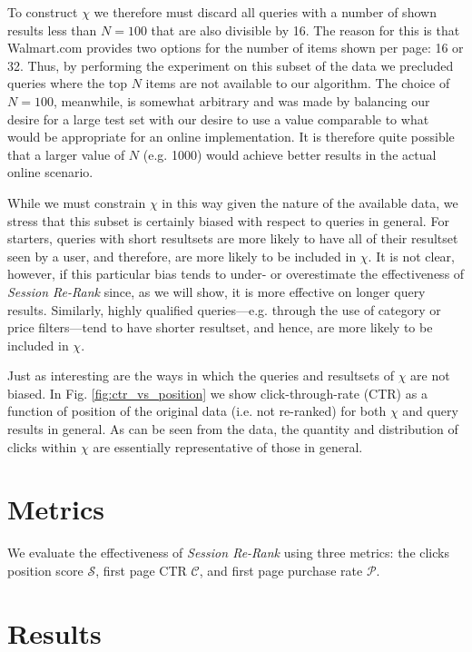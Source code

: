 \documentclass{article}
\begin{document}
To construct $\chi$ we therefore must discard all queries with a number of
shown results less than $N=100$ that are also divisible by 16. The reason for 
this is that Walmart.com provides two options for the number of items shown per
page: 16 or 32. Thus, by performing the experiment on this subset of the data we
precluded queries where the top $N$ items are not available to our algorithm.
The choice of $N=100$, meanwhile, is somewhat arbitrary and was made by balancing our desire
for a large test set with our desire to use a value comparable to what would be
appropriate for an online implementation. It is therefore quite possible that a
larger value of $N$ (e.g. 1000) would achieve better results in the actual
online scenario.

While we must constrain $\chi$ in this way given the nature of the available 
data, we stress that this subset is certainly biased with respect to queries 
in general. For starters, queries with short resultsets are more likely to 
have all of their resultset seen by a user, and therefore, are more likely to 
be included in $\chi$. It is not clear, however, if this particular bias
tends to under- or overestimate the effectiveness of {\em Session Re-Rank}
since, as we will show, it is more effective on longer query results. Similarly,
highly qualified queries---e.g. through the use of category or price filters---tend
to have shorter resultset, and hence, are more likely to be included in $\chi$.

Just as interesting are the ways in which the queries and resultsets of $\chi$
are not biased. In Fig. \ref{fig:ctr_vs_position} we show click-through-rate (CTR)
as a function of position of the original data (i.e. not re-ranked) for both
$\chi$ and query results in general. As can be seen from the data, the quantity
and distribution of clicks within $\chi$ are essentially representative of those
in general.

\section{Metrics}

We evaluate the effectiveness of {\em Session Re-Rank} using three metrics: the 
clicks position score $\mathscr{S}$, first page CTR $\mathscr{C}$, and first page 
purchase rate $\mathscr{P}$. 

\section{Results}
\end{document}
